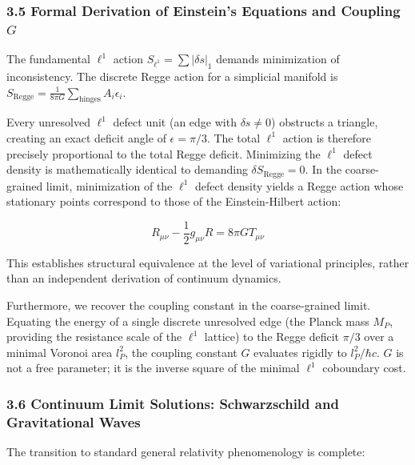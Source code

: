 \documentclass[
]{article}
\begin{document}
\hypertarget{formal-derivation-of-einsteins-equations-and-coupling-g}{%
\subsubsection{\texorpdfstring{3.5 Formal Derivation of Einstein's
Equations and Coupling
\(G\)}{3.5 Formal Derivation of Einstein's Equations and Coupling G}}\label{formal-derivation-of-einsteins-equations-and-coupling-g}}

The fundamental \(\ell^1\) action \(S_{\ell^1} = \sum |\delta s|_1\)
demands minimization of inconsistency. The discrete Regge action for a
simplicial manifold is
\(S_{\mathrm{Regge}} = \frac{1}{8\pi G} \sum_{\text{hinges}} A_i \epsilon_i\).

Every unresolved \(\ell^1\) defect unit (an edge with
\(\delta s \neq 0\)) obstructs a triangle, creating an exact deficit
angle of \(\epsilon = \pi/3\). The total \(\ell^1\) action is therefore
precisely proportional to the total Regge deficit. Minimizing the
\(\ell^1\) defect density is mathematically identical to demanding
\(\delta S_{\mathrm{Regge}} = 0\). In the coarse-grained limit,
minimization of the \(\ell^1\) defect density yields a Regge action
whose stationary points correspond to those of the Einstein-Hilbert
action:

\[
R_{\mu\nu} - \frac{1}{2} g_{\mu\nu} R = 8\pi G T_{\mu\nu}
\]

This establishes structural equivalence at the level of variational
principles, rather than an independent derivation of continuum dynamics.

Furthermore, we recover the coupling constant in the coarse-grained
limit. Equating the energy of a single discrete unresolved edge (the
Planck mass \(M_P\), providing the resistance scale of the \(\ell^1\)
lattice) to the Regge deficit \(\pi/3\) over a minimal Voronoi area
\(l_P^2\), the coupling constant \(G\) evaluates rigidly to
\(l_P^2 / \hbar c\). \(G\) is not a free parameter; it is the inverse
square of the minimal \(\ell^1\) coboundary cost.

\hypertarget{continuum-limit-solutions-schwarzschild-and-gravitational-waves}{%
\subsubsection{3.6 Continuum Limit Solutions: Schwarzschild and
Gravitational
Waves}\label{continuum-limit-solutions-schwarzschild-and-gravitational-waves}}

The transition to standard general relativity phenomenology is complete:
\end{document}
